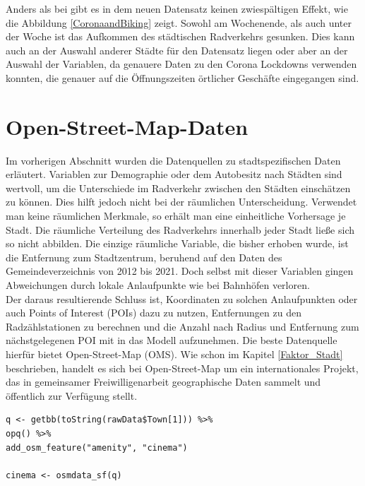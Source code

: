 \documentclass[a4paper,12pt]{thesis}
\begin{document}
Anders als bei \cite{Moellers2021} gibt es in dem neuen Datensatz keinen zwiespältigen Effekt, wie die Abbildung \ref{CoronaandBiking} zeigt. Sowohl am Wochenende, als auch unter der Woche ist das Aufkommen des städtischen Radverkehrs gesunken. Dies kann auch an der Auswahl anderer Städte für den Datensatz liegen oder aber an der Auswahl der Variablen, da \cite{Moellers2021} genauere Daten zu den Corona Lockdowns verwenden konnten, die genauer auf die Öffnungszeiten örtlicher Geschäfte eingegangen sind.

\section{Open-Street-Map-Daten}\label{OMSDATA}

Im vorherigen Abschnitt wurden die Datenquellen zu stadtspezifischen Daten erläutert. Variablen zur Demographie oder dem Autobesitz nach Städten sind wertvoll, um die Unterschiede im Radverkehr zwischen den Städten einschätzen zu können. Dies hilft jedoch nicht bei der räumlichen Unterscheidung. Verwendet man keine räumlichen Merkmale, so erhält man eine einheitliche Vorhersage je Stadt. Die räumliche Verteilung des Radverkehrs innerhalb jeder Stadt ließe sich so nicht abbilden. Die einzige räumliche Variable, die bisher erhoben wurde, ist die Entfernung zum Stadtzentrum, beruhend auf den Daten des Gemeindeverzeichnis von 2012 bis 2021. Doch selbst mit dieser Variablen gingen Abweichungen durch lokale Anlaufpunkte wie bei Bahnhöfen verloren.\\
Der daraus resultierende Schluss ist, Koordinaten zu solchen Anlaufpunkten oder auch Points of Interest (POIs) dazu zu nutzen, Entfernungen zu den Radzählstationen zu berechnen und die Anzahl nach Radius und Entfernung zum nächstgelegenen POI mit in das Modell aufzunehmen. Die beste Datenquelle hierfür bietet Open-Street-Map (OMS). Wie schon im Kapitel \ref{Faktor_Stadt} beschrieben, handelt es sich bei Open-Street-Map um ein internationales Projekt, das in gemeinsamer Freiwilligenarbeit geographische Daten sammelt und öffentlich zur Verfügung stellt.\\

\begin{lstlisting}[caption={OSM Daten Abfrage},label=code:osmdata_query]
q <- getbb(toString(rawData$Town[1])) %>%
opq() %>%
add_osm_feature("amenity", "cinema")
	
cinema <- osmdata_sf(q)
\end{lstlisting}
\end{document}
